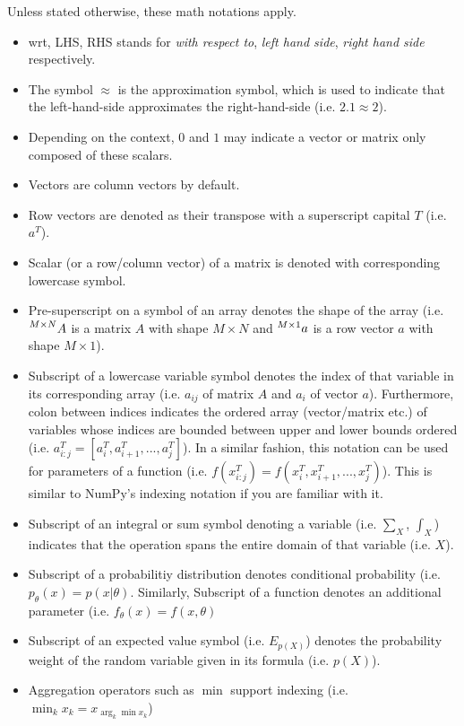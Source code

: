 \documentclass{article}
\numberwithin{equation}{subsection}
\begin{document}
Unless stated otherwise, these math notations apply. 
\begin{itemize}
    \item wrt, LHS, RHS stands for \textit{with respect to}, \textit{left hand side}, \textit{right hand side} respectively.
    \item The symbol $\approx$ is the approximation symbol, which is used to indicate that the left-hand-side approximates the right-hand-side (i.e. $2.1 \approx 2$).
    \item Depending on the context, $0$ and $1$ may indicate a vector or matrix only composed of these scalars.
    \item Vectors are column vectors by default.
    \item Row vectors are denoted as their transpose with a superscript capital $T$ (i.e. $a^T$).
    \item Scalar (or a row/column vector) of a matrix is denoted with corresponding lowercase symbol.
    \item Pre-superscript on a symbol of an array denotes the shape of the array (i.e. $\prescript{M\times N}{}{A}$ is a matrix $A$ with shape $M\times N$ and $\prescript{M\times 1}{}{a}$ is a row vector $a$ with shape $M\times 1$).
    \item Subscript of a lowercase variable symbol denotes the index of that variable in its corresponding array (i.e. $a_{ij}$ of matrix $A$ and $a_i$ of vector $a$). Furthermore, colon between indices indicates the ordered array (vector/matrix etc.) of variables whose indices are bounded between upper and lower bounds ordered (i.e. $a^T_{i:j} = [a^T_i, a^T_{i+1}, ..., a^T_j]$). In a similar fashion, this notation can be used for parameters of a function (i.e. $f(x^T_{i:j}) = f(x^T_i, x^T_{i+1}, ..., x^T_j)$). This is similar to NumPy's indexing notation if you are familiar with it.
    \item Subscript of an integral or sum symbol denoting a variable (i.e. $\sum_X$, $\int_X$) indicates that the operation spans the entire domain of that variable (i.e. $X$).
    \item Subscript of a probabilitiy distribution denotes conditional probability (i.e. $p_\theta(x) = p(x|\theta)$. Similarly, Subscript of a function denotes an additional parameter (i.e. $f_\theta(x) = f(x, \theta)$
    \item Subscript of an expected value symbol (i.e. $E_{p(X)}$) denotes the probability weight of the random variable given in its formula (i.e. $p(X)$).
    \item Aggregation operators such as $\min$ support indexing (i.e. $\min_kx_k = x_{\arg_k\min x_k}$)
\end{itemize}
\end{document}
